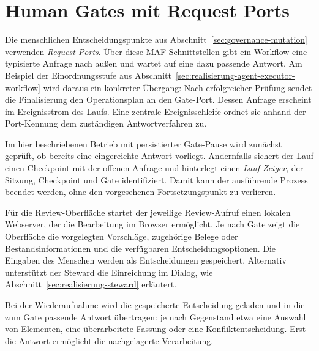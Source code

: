 
\section{Human Gates mit Request Ports}
\label{sec:realisierung-human-gates}

Die menschlichen Entscheidungspunkte aus
Abschnitt~\ref{sec:governance-mutation} verwenden \emph{Request Ports}.
Über diese MAF-Schnittstellen gibt ein Workflow eine typisierte Anfrage
nach außen und wartet auf eine dazu passende Antwort. Am Beispiel der
Einordnungsstufe aus
Abschnitt~\ref{sec:realisierung-agent-executor-workflow} wird daraus
ein konkreter Übergang: Nach erfolgreicher Prüfung sendet die
Finalisierung den Operationsplan an den Gate-Port. Dessen Anfrage
erscheint im Ereignisstrom des Laufs. Eine zentrale Ereignisschleife
ordnet sie anhand der Port-Kennung dem zuständigen Antwortverfahren zu.

Im hier beschriebenen Betrieb mit persistierter Gate-Pause wird
zunächst geprüft, ob bereits eine eingereichte Antwort vorliegt.
Andernfalls sichert der Lauf einen Checkpoint mit der offenen Anfrage
und hinterlegt einen \emph{Lauf-Zeiger}, der Sitzung, Checkpoint und
Gate identifiziert. Damit kann der ausführende Prozess beendet
werden, ohne den vorgesehenen Fortsetzungspunkt zu verlieren.

Für die Review-Oberfläche startet der jeweilige Review-Aufruf einen
lokalen Webserver, der die Bearbeitung im Browser ermöglicht. Je nach
Gate zeigt die Oberfläche die vorgelegten Vorschläge, zugehörige Belege
oder Bestandsinformationen und die verfügbaren Entscheidungsoptionen.
Die Eingaben des Menschen werden als Entscheidungen gespeichert.
Alternativ unterstützt der Steward die Einreichung im Dialog, wie
Abschnitt~\ref{sec:realisierung-steward} erläutert.

Bei der Wiederaufnahme wird die gespeicherte Entscheidung geladen und
in die zum Gate passende Antwort übertragen: je nach Gegenstand etwa
eine Auswahl von Elementen, eine überarbeitete Fassung oder eine
Konfliktentscheidung. Erst die Antwort ermöglicht die nachgelagerte
Verarbeitung.

